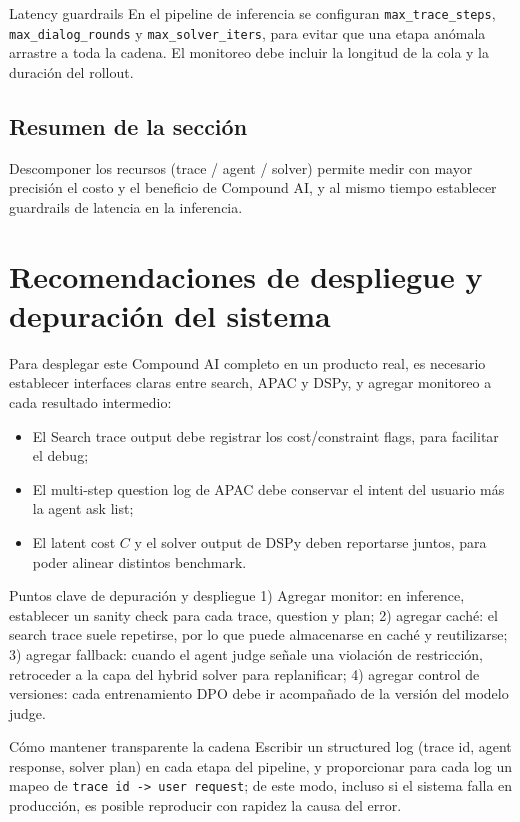 \documentclass[a4paper]{article}
\begin{document}
\begin{knowledgebox}{Latency guardrails}
En el pipeline de inferencia se configuran \texttt{max\_trace\_steps}, \texttt{max\_dialog\_rounds} y \texttt{max\_solver\_iters}, para evitar que una etapa anómala arrastre a toda la cadena. El monitoreo debe incluir la longitud de la cola y la duración del rollout.
\end{knowledgebox}

\subsection{Resumen de la sección}

Descomponer los recursos (trace / agent / solver) permite medir con mayor precisión el costo y el beneficio de Compound AI, y al mismo tiempo establecer guardrails de latencia en la inferencia.
\section{Recomendaciones de despliegue y depuración del sistema}

Para desplegar este Compound AI completo en un producto real, es necesario establecer interfaces claras entre search, APAC y DSPy, y agregar monitoreo a cada resultado intermedio:
\begin{itemize}
    \item El Search trace output debe registrar los cost/constraint flags, para facilitar el debug;
    \item El multi-step question log de APAC debe conservar el intent del usuario más la agent ask list;
    \item El latent cost \(C\) y el solver output de DSPy deben reportarse juntos, para poder alinear distintos benchmark.
\end{itemize}

\begin{importantbox}{Puntos clave de depuración y despliegue}
1) Agregar monitor: en inference, establecer un sanity check para cada trace, question y plan; 2) agregar caché: el search trace suele repetirse, por lo que puede almacenarse en caché y reutilizarse; 3) agregar fallback: cuando el agent judge señale una violación de restricción, retroceder a la capa del hybrid solver para replanificar; 4) agregar control de versiones: cada entrenamiento DPO debe ir acompañado de la versión del modelo judge.
\end{importantbox}

\begin{knowledgebox}{Cómo mantener transparente la cadena}
Escribir un structured log (trace id, agent response, solver plan) en cada etapa del pipeline, y proporcionar para cada log un mapeo de \texttt{trace id -> user request}; de este modo, incluso si el sistema falla en producción, es posible reproducir con rapidez la causa del error.
\end{knowledgebox}
\end{document}
